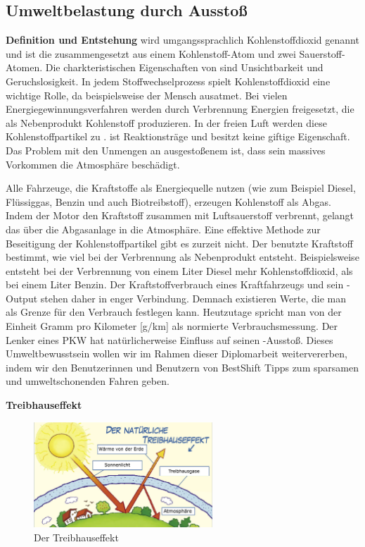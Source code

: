 \subsection{Umweltbelastung durch  Ausstoß}


\textbf{Definition und Entstehung\newline}
 wird umgangssprachlich Kohlenstoffdioxid genannt und ist die zusammengesetzt aus einem Kohlenstoff-Atom und zwei Sauerstoff-Atomen. 
Die charkteristischen Eigenschaften von  sind Unsichtbarkeit und Geruchslosigkeit. 
In jedem Stoffwechselprozess spielt Kohlenstoffdioxid eine wichtige Rolle, da beispielsweise der Mensch  ausatmet. 
Bei vielen Energiegewinnungsverfahren werden durch Verbrennung Energien freigesetzt, die als Nebenprodukt Kohlenstoff produzieren. 
In der freien Luft werden diese Kohlenstoffpartikel zu .
 ist Reaktionsträge und besitzt keine giftige Eigenschaft. 
Das Problem mit den Unmengen an ausgestoßenem  ist, dass sein massives Vorkommen die Atmosphäre beschädigt.

Alle Fahrzeuge, die Kraftstoffe als Energiequelle nutzen 
(wie zum Beispiel Diesel, Flüssiggas, Benzin und auch Biotreibstoff), erzeugen Kohlenstoff als Abgas. 
Indem der Motor den Kraftstoff zusammen mit Luftsauerstoff verbrennt, gelangt das  über die Abgasanlage in die Atmosphäre. 
Eine effektive Methode zur Beseitigung der Kohlenstoffpartikel gibt es zurzeit nicht. 
Der benutzte Kraftstoff bestimmt, wie viel  bei der Verbrennung als Nebenprodukt entsteht.
Beispielsweise entsteht bei der Verbrennung von einem Liter Diesel mehr Kohlenstoffdioxid, als bei einem Liter Benzin.
Der Kraftstoffverbrauch eines Kraftfahrzeugs und sein -Output stehen daher in enger Verbindung.
Demnach existieren Werte, die man als Grenze für den Verbrauch festlegen kann. 
Heutzutage spricht man von der Einheit Gramm pro Kilometer [g/km] als normierte Verbrauchsmessung.
Der Lenker eines PKW hat natürlicherweise Einfluss auf seinen -Ausstoß. 
Dieses Umweltbewusstsein wollen wir im Rahmen dieser Diplomarbeit weitervererben, indem wir den Benutzerinnen und Benutzern 
von BestShift Tipps zum sparsamen und umweltschonenden Fahren geben. \nextline


\textbf{Treibhauseffekt}
\begin{figure}
    \centering
    \includegraphics[width=0.6\textwidth]{images/treibhaus1}
    \caption{Der Treibhauseffekt \cite{BOZH.ch1-co2-umwelt.treibhaus1}}
\end{figure}

